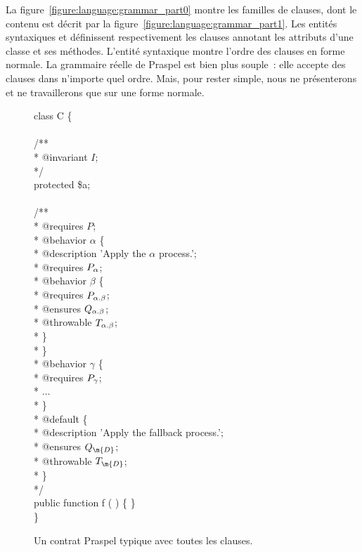 La figure~\ref{figure:language:grammar_part0} montre les familles de clauses,
dont le contenu est décrit par la figure~\ref{figure:language:grammar_part1}.
Les entités syntaxiques  et 
définissent respectivement les clauses annotant les attributs d'une classe et
ses méthodes. L'entité syntaxique  montre l'ordre des
clauses en forme normale. La grammaire réelle de Praspel est bien plus souple~:
elle accepte des clauses dans n'importe quel ordre. Mais, pour rester simple,
nous ne présenterons et ne travaillerons que sur une forme normale.

\begin{figure}
\begin{bigpre}
class C \{ \\
\\
    /** \\
     * @invariant \(I\); \\
     */ \\
    protected \$a; \\
\\
    /** \\
     * @requires \(P\); \\
     * @behavior \(\alpha\) \{ \\
     *     @description 'Apply the \(\alpha\) process.'; \\
     *     @requires \(P\sb{\alpha}\); \\
     *     @behavior \(\beta\) \{ \\
     *         @requires  \(P\sb{\alpha.\beta}\); \\
     *         @ensures   \(Q\sb{\alpha.\beta}\); \\
     *         @throwable \(T\sb{\alpha.\beta}\); \\
     *     \} \\
     * \} \\
     * @behavior \(\gamma\) \{ \\
     *     @requires \(P\sb{\gamma}\); \\
     *     \(\dots\) \\
     * \} \\
     * @default \{ \\
     *     @description 'Apply the fallback process.'; \\
     *     @ensures   \(Q\sb{\m{D}}\); \\
     *     @throwable \(T\sb{\m{D}}\); \\
     * \} \\
     */ \\
    public function f ( ) \{ \} \\
\}
\end{bigpre}

\caption{\label{figure:language:typical_contract} Un contrat Praspel typique
avec toutes les clauses.}

\end{figure}

